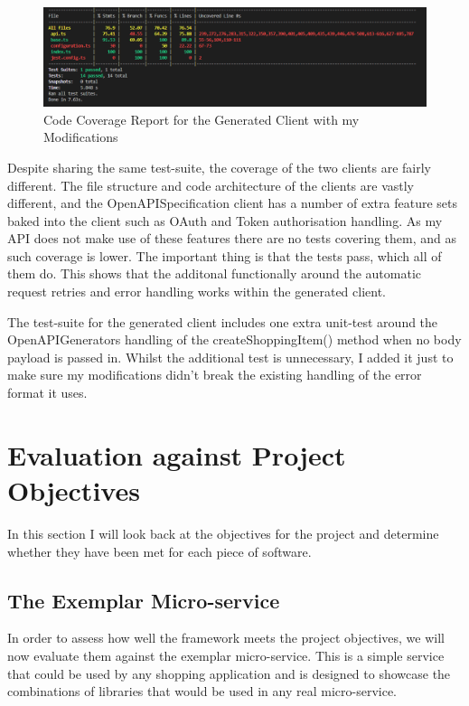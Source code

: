 \begin{figure}[!htb]
\caption{Code Coverage Report for the Generated Client with my Modifications}
\centering
\includegraphics[scale=0.55]{FYP_Dissertation_template/Figures/modified-client-code-coverage.PNG}
\end{figure}

Despite sharing the same test-suite, the coverage of the two clients are fairly different. The file structure and code architecture of the clients are vastly different, and the OpenAPISpecification client has a number of extra feature sets baked into the client such as OAuth and Token authorisation handling. As my API does not make use of these features there are no tests covering them, and as such coverage is lower. The important thing is that the tests pass, which all of them do. This shows that the additonal functionally around the automatic request retries and error handling works within the generated client.

The test-suite for the generated client includes one extra unit-test around the OpenAPIGenerators handling of the createShoppingItem() method when no body payload is passed in. Whilst the additional test is unnecessary, I added it just to make sure my modifications didn't break the existing handling of the error format it uses.
\section{Evaluation against Project Objectives}
In this section I will look back at the objectives for the project and determine whether they have been met for each piece of software.
\subsection{The Exemplar Micro-service}
In order to assess how well the framework meets the project objectives, we will now evaluate them against the exemplar micro-service. This is a simple service that could be used by any shopping application and is designed to showcase the combinations of libraries that would be used in any real micro-service.
